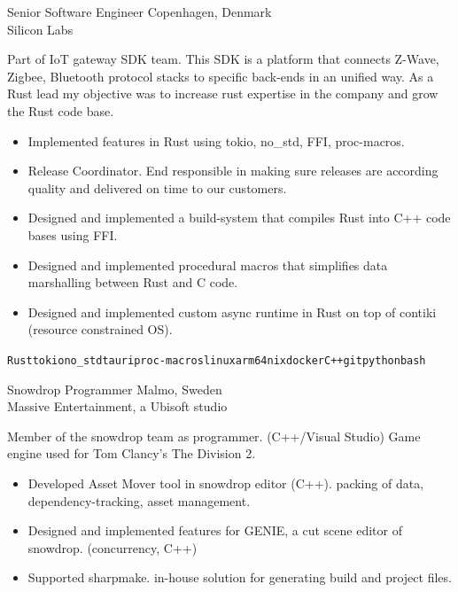 \documentclass[9pt]{developercv} %
\begin{document}
\begin{entrylist}
	\entry
        {}
		{Senior Software Engineer}
        {Copenhagen, Denmark\\Silicon Labs}
		{Part of IoT gateway SDK team. This SDK is a platform that connects Z-Wave, Zigbee, Bluetooth protocol stacks to specific back-ends in an unified way. As a Rust lead my objective was to increase rust expertise in the company and grow the Rust code base.
          \begin{itemize}
           \setlength\itemsep{-0.5em}
                \item {Implemented features in Rust using tokio, no\_std, FFI, proc-macros.}
        		\item {Release Coordinator. End responsible in making sure releases are according quality and delivered on time to our customers.}
                \item {Designed and implemented a build-system that compiles Rust into C++ code bases using FFI.}
        		\item {Designed and implemented procedural macros that simplifies data marshalling between Rust and C code.}
        		\item {Designed and implemented custom async runtime in Rust on top of contiki (resource constrained OS).}
          \end{itemize}
        \texttt{Rust}\slashsep\texttt{tokio}\slashsep\texttt{no\_std}\slashsep\texttt{tauri}\slashsep\texttt{proc-macros}\slashsep\texttt{linux}\slashsep\texttt{arm64}\slashsep\texttt{nix}\slashsep\texttt{docker}\slashsep\texttt{C++}\slashsep\texttt{git}\slashsep\texttt{python}\slashsep\texttt{bash}
        }
	\entry
		{}
		{Snowdrop Programmer}
		{Malmo, Sweden\\Massive Entertainment, a Ubisoft studio}
		{Member of the snowdrop team as programmer. (C++/Visual Studio) Game engine used for Tom Clancy's The Division 2.
          \begin{itemize}
           \setlength\itemsep{-0.5em}
            \item { Developed Asset Mover tool in snowdrop editor (C++). packing of data, dependency-tracking, asset management.}
            \item { Designed and implemented features for GENIE, a cut scene editor of snowdrop. (concurrency, C++) }
            \item { Supported sharpmake. in-house solution for generating build and
                project files. }

\end{itemize}}
\end{entrylist}
\end{document}

